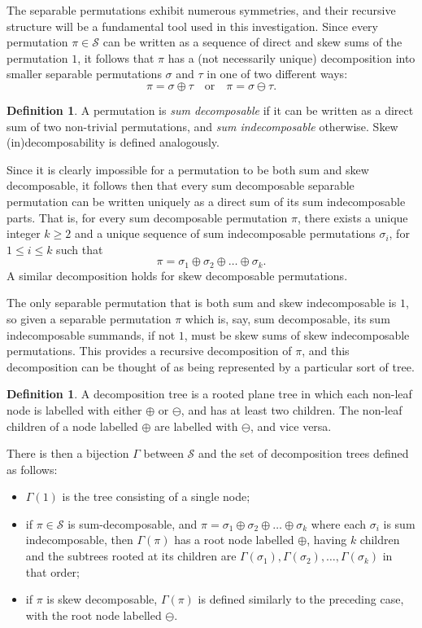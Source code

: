 \documentclass[10pt]{article}
\theoremstyle{definition}
\newtheorem{definition}[theorem]{Definition}
\numberwithin{equation}{section}
\numberwithin{figure}{section}
\newcommand{\Sep}{{\mathcal{S}}}
\begin{document}
The separable permutations exhibit numerous symmetries, and their recursive structure will be a fundamental tool used in this investigation.  Since every permutation $\pi \in \mathcal{S}$ can be written as a sequence of direct and skew sums of the permutation $1$, it follows that $\pi$ has a (not necessarily unique) decomposition into smaller separable permutations $\sigma$ and $\tau$ in one of two different ways:
\[
\pi = \sigma \oplus \tau \quad \text{or} \quad \pi = \sigma \ominus \tau.
\]

\begin{definition}
A permutation is \emph{sum decomposable} if it can be written as a direct sum of two non-trivial permutations, and \emph{sum indecomposable} otherwise. Skew (in)decomposability is defined analogously. 
\end{definition}

Since it is clearly impossible for a permutation to be both sum and skew decomposable, it follows then that every sum decomposable separable permutation can be written uniquely as a direct sum of its sum indecomposable parts. That is, for every sum decomposable permutation $\pi$, there exists a unique integer $k \geq 2$ and a unique sequence of sum indecomposable permutations $\sigma_i$, for $1 \leq i \leq k$ such that 
\[
\pi = \sigma_1 \oplus \sigma_2 \oplus \dots \oplus \sigma_k.
\] 
A similar decomposition holds for skew decomposable permutations. 

The only separable permutation that is both sum and skew indecomposable is $1$, so given a separable permutation $\pi$ which is, say, sum decomposable, its sum indecomposable summands, if not $1$, must be skew sums of skew indecomposable permutations. This provides a recursive decomposition of $\pi$, and this decomposition can be thought of as being represented by a particular sort of tree.

\begin{definition}
A decomposition tree is a rooted plane tree in which each non-leaf node is labelled with either $\oplus$ or $\ominus$, and has at least two children.  The non-leaf children of a node labelled $\oplus$ are labelled with $\ominus$, and vice versa. 
\end{definition}

There is then a bijection $\Gamma$ between $\mathcal{S}$ and the set of decomposition trees defined as follows:
\begin{itemize}
\item
$\Gamma(1)$ is the tree consisting of a single node;
\item
if $\pi \in \Sep$ is sum-decomposable, and $\pi = \sigma_1 \oplus \sigma_2 \oplus \dots \oplus \sigma_k$ where each $\sigma_i$ is sum indecomposable, then $\Gamma(\pi)$ has a root node labelled $\oplus$, having $k$ children and the subtrees rooted at its children are $\Gamma(\sigma_1), \Gamma(\sigma_2), \dots, \Gamma(\sigma_k)$ in that order;
\item
if $\pi$ is skew decomposable, $\Gamma(\pi)$ is defined similarly to the preceding case, with the root node labelled $\ominus$.
\end{itemize}
\end{document}
